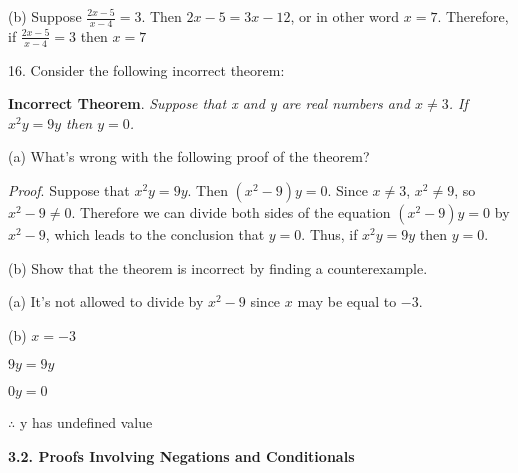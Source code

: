 \documentclass{article}
\begin{document}
(b) Suppose $\frac{2x-5}{x-4} = 3$. Then $2x - 5 = 3x - 12$, or in other word $x = 7$.
Therefore, if $\frac{2x-5}{x-4} = 3$ then $x = 7$

\vspace{30pt}

16. Consider the following incorrect theorem:

\textbf{Incorrect Theorem}. \textit{Suppose that x and y are real numbers and $x \neq 3$.
If $x^2y = 9y$ then $y = 0$.}

\hspace{12pt}(a) What’s wrong with the following proof of the theorem?

\textit{Proof}. Suppose that $x^2y = 9y$. Then $(x^2 - 9)y = 0$. Since $x \neq 3$,
$x^2 \neq 9$, so $x^2 - 9 \neq 0$. Therefore we can divide both sides of the
equation $(x^2 - 9)y = 0$ by $x^2 - 9$, which leads to the conclusion
that $y = 0$. Thus, if $x^2y = 9y$ then $y = 0$.

\hspace{12pt}(b) Show that the theorem is incorrect by finding a counterexample.

\vspace{20pt}

(a) It's not allowed to divide by $x^2 - 9$ since $x$ may be equal to $-3$.

\vspace{20pt}

(b) $x = -3$

$9y = 9y$

$0y = 0$

$\therefore$ y has undefined value

\vspace{50pt}

\textbf{3.2. Proofs Involving Negations and Conditionals}
\end{document}
